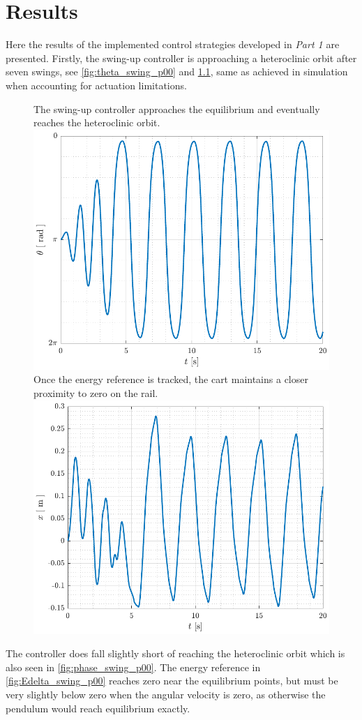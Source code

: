 \chapter{Results}
Here the results of the implemented control strategies developed in \textit{Part 1} are presented. Firstly, the swing-up controller is approaching a heteroclinic orbit after seven swings, see \autoref{fig:theta_swing_p00} and \ref{fig:x_swing_p00}, same as achieved in simulation when accounting for actuation limitations.
%
%
\begin{figure}[H]
  \hspace{1cm}
  \captionbox
  {
    The swing-up controller approaches the equilibrium and eventually reaches the heteroclinic orbit.
    \label{fig:theta_swing_p00}
  }
  {
    \hspace{-1cm}
    \includegraphics[width=.39\textwidth]{figures/theta_swing_p00}
  }
  \hspace{20pt}
  \captionbox 
  {
    Once the energy reference is tracked, the cart maintains a closer proximity to zero on the rail.
    \label{fig:x_swing_p00}
  }
  {
    \hspace{-1cm}
    \includegraphics[width=.4\textwidth]{figures/x_swing_p00}
  }  
\end{figure}
%
The controller does fall slightly short of reaching the heteroclinic orbit which is also seen in \autoref{fig:phase_swing_p00}. The energy reference in \autoref{fig:Edelta_swing_p00} reaches zero near the equilibrium points, but must be very slightly below zero when the angular velocity is zero, as otherwise the pendulum would reach equilibrium exactly.
